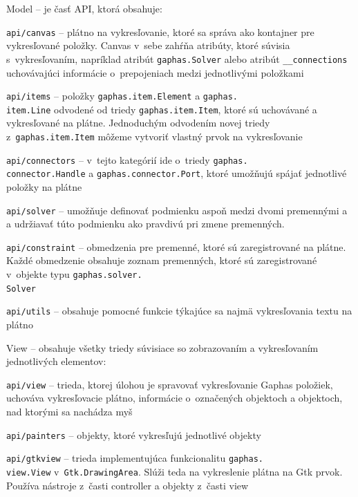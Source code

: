 \documentclass[11pt,oneside,final]{fithesis2}
\begin{document}
\begin{list}{•}{}

\item Model -- je časť API, ktorá obsahuje:

    \begin{list}{•}{}
    	\item \texttt{api/canvas} -- plátno na vykresľovanie, ktoré sa správa ako kontajner pre vykresľované položky. Canvas v~sebe zahŕňa atribúty, ktoré súvisia s~vykresľovaním, napríklad atribút \texttt{gaphas.Solver} alebo atribút \texttt{\_\_connections} uchovávajúci informácie o~prepojeniach medzi jednotlivými položkami
    	\item \texttt{api/items} -- položky \texttt{gaphas.item.Element} a \texttt{gaphas.\\item.Line} odvodené od triedy \texttt{gaphas.item.Item}, ktoré sú uchovávané a vykresľované na plátne.
    	Jednoduchým odvodením novej triedy z~\texttt{gaphas.item.Item} môžeme vytvoriť vlastný prvok na vykresľovanie
    	\item \texttt{api/connectors} -- v~tejto kategórií ide o~triedy \texttt{gaphas.\\connector.Handle} a \texttt{gaphas.connector.Port}, ktoré umožňujú spájať jednotlivé položky na plátne
    	\item \texttt{api/solver} -- umožňuje definovať podmienku aspoň medzi dvomi premennými a a udržiavať túto podmienku ako pravdivú pri zmene premenných.
 		\item \texttt{api/constraint} -- obmedzenia pre premenné, ktoré sú zaregistrované na plátne. Každé obmedzenie obsahuje zoznam premenných, ktoré sú zaregistrované v~objekte typu \texttt{gaphas.solver.\\Solver}
 		\item \texttt{api/utils} -- obsahuje pomocné funkcie týkajúce sa najmä vykresľovania textu na plátno
    \end{list}


\item View -- obsahuje všetky triedy súvisiace so zobrazovaním a vykresľovaním jednotlivých elementov:
    \begin{list}{•}{}
    \item \texttt{api/view} -- trieda, ktorej úlohou je spravovať vykresľovanie Gaphas položiek, uchováva vykresľovacie plátno, informácie o~označených objektoch a objektoch, nad ktorými sa nachádza myš
    \item \texttt{api/painters} -- objekty, ktoré vykresľujú jednotlivé objekty
    \item \texttt{api/gtkview} -- trieda implementujúca funkcionalitu \texttt{gaphas.\\view.View} v~\texttt{Gtk.DrawingArea}. Slúži teda na vykreslenie plátna na Gtk prvok. Používa nástroje z~časti controller a objekty z~časti view
    \end{list}



\end{list}
\end{document}
